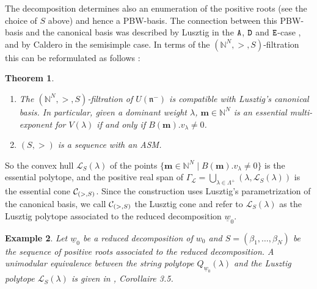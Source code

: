 \documentclass{emsprocart}
\newtheorem{theorem}{Theorem}[section]
\newtheorem{example}[theorem]{Example}
\theoremstyle{definition}
\begin{document}
The decomposition determines also an enumeration of the positive roots (see the choice of $S$ above) and hence a PBW-basis.
The connection between this PBW-basis and the canonical basis was described by Lusztig in the $\tt A$, $\tt D$ and $\tt E$-case
\cite{Lu1,Lu2}, and by Caldero  \cite{Ca1} in the semisimple case. In terms of the $(\mathbb N^N,>,S)$-filtration
this can be reformulated as follows \cite{FaFL}:
\begin{theorem}\it
\begin{enumerate}
\item The $(\mathbb N^N,>,S)$-filtration of $U(\mathfrak n^-)$ is compatible with Lusztig's canonical basis.
In particular, given a dominant weight $\lambda$, $\mathbf m\in   \mathbb N^N$ is an essential
multi-exponent for $V(\lambda)$ if and only if $B(\mathbf m).v_\lambda\not=0$.
\item $(S,>)$ is a sequence with an ASM.
\end{enumerate}
\end{theorem}
So the convex hull $\mathcal{L}_S(\lambda)$ of the points $\{\mathbf m\in\mathbb N^N\mid B(\mathbf m).v_\lambda\not=0\}$
is the essential polytope, and the positive real span of $\Gamma_\mathcal{L}=\bigcup_{\lambda\in\Lambda^+} (\lambda, \mathcal{L}_S(\lambda))$
is the essential cone ${\cal C}_{(>,S)}$. Since the construction uses Lusztig's parametrization of the canonical basis,
we call ${\cal C}_{(>,S)}$ the Lusztig cone and refer to $\mathcal{L}_S(\lambda)$ as the Lusztig polytope associated to the reduced 
decomposition  $\underline{w}_0$.

\begin{example}\rm
Let $\underline{w}_0$ be a reduced decomposition of $w_0$ and $S=(\beta_1,\ldots,\beta_N)$ be the sequence of positive roots associated to the reduced decomposition. A unimodular equivalence between the string polytope $Q_{\underline{w}_0}(\lambda)$ and the Lusztig polytope $\mathcal{L}_S(\lambda)$ is given in \cite{MG}, Corollaire 3.5.
\end{example}


\end{document}

